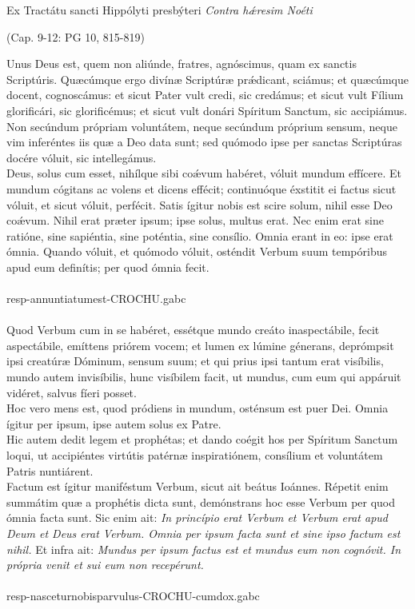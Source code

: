 \documentclass[options]{article}
\begin{document}
Ex Tractátu sancti Hippólyti presbýteri \emph{Contra h\'{æ}resim Noéti}
\begin{flushright}
	(Cap. 9-12: PG 10, 815-819)
\end{flushright}
	Unus Deus est, quem non aliúnde, fratres, agnóscimus, quam ex sanctis Scriptúris. Quæcúmque ergo divínæ Scriptúræ pr\'{æ}dicant, sciámus; et quæcúmque docent, cognoscámus: et sicut Pater vult credi, sic credámus; et sicut vult Fílium glorificári, sic glorificémus; et sicut vult donári Spíritum Sanctum, sic accipiámus. Non secúndum própriam voluntátem, neque secúndum próprium sensum, neque vim inferéntes iis quæ a Deo data sunt; sed quómodo ipse per sanctas Scriptúras docére vóluit, sic intellegámus.\\
	Deus, solus cum esset, nihílque sibi co\'{æ}vum habéret, vóluit mundum effícere. Et mundum cógitans ac volens et dicens effécit; continuóque éxstitit ei factus sicut vóluit, et sicut vóluit, perfécit. Satis ígitur nobis est scire solum, nihil esse Deo co\'{æ}vum. Nihil erat præter ipsum; ipse solus, multus erat. Nec enim erat sine ratióne, sine sapiéntia, sine poténtia, sine consílio. Omnia erant in eo: ipse erat ómnia. Quando vóluit, et quómodo vóluit, osténdit Verbum suum tempóribus apud eum definítis; per quod ómnia fecit.\\
\\
resp-annuntiatumest-CROCHU.gabc\\
\\
Quod Verbum cum in se habéret, essétque mundo creáto inaspectábile, fecit aspectábile, emíttens priórem vocem; et lumen ex lúmine génerans, deprómpsit ipsi creatúræ Dóminum, sensum suum; et qui prius ipsi tantum erat visíbilis, mundo autem invisíbilis, hunc visíbilem facit, ut mundus, cum eum qui appáruit vidéret, salvus fíeri posset.\\
Hoc vero mens est, quod pródiens in mundum, osténsum est puer Dei. Omnia ígitur per ipsum, ipse autem solus ex Patre.\\
Hic autem dedit legem et prophétas; et dando coégit hos per Spíritum Sanctum loqui, ut accipiéntes virtútis patérnæ inspiratiónem, consílium et voluntátem Patris nuntiárent.\\
Factum est ígitur maniféstum Verbum, sicut ait beátus Ioánnes. Répetit enim summátim quæ a prophétis dicta sunt, demónstrans hoc esse Verbum per quod ómnia facta sunt. Sic enim ait: \emph{In princípio erat Verbum et Verbum erat apud Deum et Deus erat Verbum. Omnia per ipsum facta sunt et sine ipso factum est nihil.} Et infra ait: \emph{Mundus per ipsum factus est et mundus eum non cognóvit. In própria venit et sui eum non recepérunt.}\\
\\
resp-nasceturnobisparvulus-CROCHU-cumdox.gabc
\end{document}

